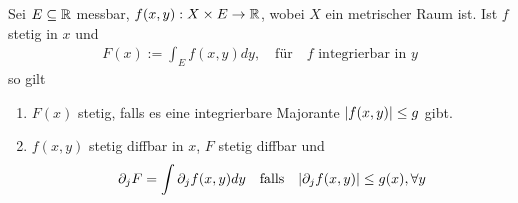 \begin{satz}[]
	Sei $E \subseteq \mathbb{R}$ messbar, $f(x,y): X \times E \to \mathbb{R}$, wobei $X$ ein metrischer Raum ist. Ist $f$ stetig in $x$ und 
	\begin{align*}
		F(x) := \int_E f(x,y) dy, \quad \text{für} \quad f \text{ integrierbar in }y
	\end{align*}
	so gilt
	\begin{enumerate}
		\item $F(x)$ stetig, falls es eine integrierbare Majorante $\vert f(x,y)\vert \leq g$ gibt.
		\item $f(x,y)$ stetig diffbar in $x$, $F$ stetig diffbar und
			\begin{align*}
				\partial_j F = \int \partial_j f(x,y) dy \quad \text{falls} \quad \vert\partial_jf(x,y)\vert \leq g(x), \forall y 
			\end{align*}
	\end{enumerate}
\end{satz}



